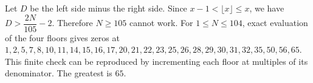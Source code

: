 Let $D$ be the left side minus the right side. Since $x-1<\lfloor x\rfloor\le x$, we have $D>\dfrac{2N}{105}-2$. Therefore $N\ge105$ cannot work. For $1\le N\le104$, exact evaluation of the four floors gives zeros at $1,2,5,7,8,10,11,14,15,16,17,20,21,22,23,25,26,28,29,30,31,32,35,50,56,65$. This finite check can be reproduced by incrementing each floor at multiples of its denominator. The greatest is $\boxed{65}$.
